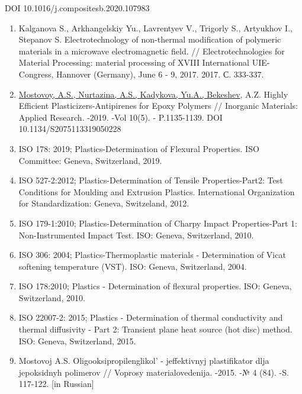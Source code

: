 \begin{references}
DOI 10.1016/j.compositesb.2020.107983

\begin{enumerate}
\def\labelenumi{\arabic{enumi}.}
\setcounter{enumi}{20}
\item
  Kalganova S., Arkhangelskiy Yu., Lavrentyev V., Trigorly S., Artyukhov
  I., Stepanov S. Electrotechnology of non-thermal modification of
  polymeric materials in a microwave electromagnetic field. //
  Electrotechnologies for Material Processing: material processing of
  XVIII International UIE-Congress, Hannover (Germany), June 6 - 9,
  2017. 2017. С. 333-337.
\item
  \href{https://www.en.j-pm.ru/kopiya-2019-1-articles1-7}{Mostovoy,
  A.S., Nurtazina, A.S., Kadykova, Yu.A., Bekeshev}, A.Z. Highly
  Efficient Plasticizers-Antipirenes for Epoxy Polymers // Inorganic
  Materials: Applied Research. -2019. -Vol 10(5). - P.1135-1139. DOI
  10.1134/S2075113319050228
\item
  ISO 178: 2019; Plastics-Determination of Flexural Properties. ISO
  Committee: Geneva, Switzerland, 2019.
\item
  ISO 527-2:2012; Plastics-Determination of Tensile Properties-Part2:
  Test Conditions for Moulding and Extrusion Plastics. International
  Organization for Standardization: Geneva, Switzeland, 2012.
\item
  ISO 179-1:2010; Plastics-Determination of Charpy Impact
  Properties-Part 1: Non-Instrumented Impact Test. ISO: Geneva,
  Switzerland, 2010.
\item
  ISO 306: 2004; Plastics-Thermoplastic materials - Determination of
  Vicat softening temperature (VST). ISO: Geneva, Switzerland, 2004.
\item
  ISO 178:2010; Plastics - Determination of flexural properties. ISO:
  Geneva, Switzerland, 2010.
\item
  ISO 22007-2: 2015; Plastics - Determination of thermal conductivity
  and thermal diffusivity - Part 2: Transient plane heat source (hot
  disc) method. ISO: Geneva, Switzerland, 2015.
\item
  Mostovoj A.S. Oligooksipropilenglikol'{} - jeffektivnyj
  plastifikator dlja jepoksidnyh polimerov // Voprosy materialovedenija.
  -2015. -№ 4 (84). -S. 117-122. {[}in Russian{]}
\end{enumerate}
\end{references}

